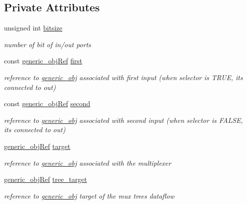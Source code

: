 \subsection*{Private Attributes}
\begin{DoxyCompactItemize}
\item 
unsigned int \hyperlink{classmux__obj_abe7701f0be3d5c18240f3111254ec3e5}{bitsize}
\begin{DoxyCompactList}\small\item\em number of bit of in/out ports \end{DoxyCompactList}\item 
const \hyperlink{generic__obj_8hpp_acb533b2ef8e0fe72e09a04d20904ca81}{generic\+\_\+obj\+Ref} \hyperlink{classmux__obj_aa9c5fc6891933d32ba3391f1ab7b191c}{first}
\begin{DoxyCompactList}\small\item\em reference to \hyperlink{classgeneric__obj}{generic\+\_\+obj} associated with first input (when selector is T\+R\+UE, it\textquotesingle{}s connected to out) \end{DoxyCompactList}\item 
const \hyperlink{generic__obj_8hpp_acb533b2ef8e0fe72e09a04d20904ca81}{generic\+\_\+obj\+Ref} \hyperlink{classmux__obj_ad74f976cc4b0e190b6b33b1f98f87b89}{second}
\begin{DoxyCompactList}\small\item\em reference to \hyperlink{classgeneric__obj}{generic\+\_\+obj} associated with second input (when selector is F\+A\+L\+SE, it\textquotesingle{}s connected to out) \end{DoxyCompactList}\item 
\hyperlink{generic__obj_8hpp_acb533b2ef8e0fe72e09a04d20904ca81}{generic\+\_\+obj\+Ref} \hyperlink{classmux__obj_a91e81a9c6b8894cadf3be9a497873948}{target}
\begin{DoxyCompactList}\small\item\em reference to \hyperlink{classgeneric__obj}{generic\+\_\+obj} associated with the multiplexer \end{DoxyCompactList}\item 
\hyperlink{generic__obj_8hpp_acb533b2ef8e0fe72e09a04d20904ca81}{generic\+\_\+obj\+Ref} \hyperlink{classmux__obj_a8060a8621b6a23897ec9b7f9de007e3a}{tree\+\_\+target}
\begin{DoxyCompactList}\small\item\em reference to \hyperlink{classgeneric__obj}{generic\+\_\+obj} target of the mux tree\textquotesingle{}s dataflow \end{DoxyCompactList}\item 

\end{DoxyCompactItemize}
